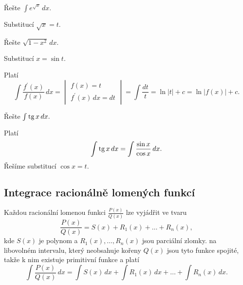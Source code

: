 \begin{priklad}
Řešte $\int e^{\sqrt{x} }\, dx$.
\end{priklad}

\begin{reseni}
Substitucí $\sqrt{x}=t $.
\end{reseni}

\begin{priklad}
Řešte $\sqrt{1-x^2}\, dx.$
\end{priklad}

\begin{reseni}
Substitucí $x=\sin t$.
\end{reseni}

\begin{pozn}
    Platí
    $$\int \frac{f^\prime(x)}{f(x)}\, dx=\begin{vmatrix}
        f(x)=t \\
        f^\prime(x) \, dx = dt
    \end{vmatrix}=\int \frac{dt}{t}=\ln |t|+c=\ln |f(x)|+c.$$
\end{pozn}

\begin{priklad}
Řešte $\int \operatorname{tg} x\, dx.$
\end{priklad}

\begin{reseni}
Platí
$$\int \operatorname{tg} x\, dx=\int \frac{\sin x}{\cos x}\, dx.$$
Řešíme substitucí $\cos x=t.$
\end{reseni}

\subsection*{Integrace racionálně lomených funkcí}
\begin{pozn}
    Každou racionální lomenou funkci $\frac{P(x)}{Q(x)}$ lze vyjádřit ve tvaru
    $$\frac{P(x)}{Q(x)}=S(x)+R_1(x)+\dots+R_n(x),$$
    kde $S(x)$ je polynom a $R_1(x),\dots,R_n(x)$ jsou parciální zlomky.
    na libovolném intervalu, který neobsahuje kořeny $Q(x)$ jsou tyto funkce spojité,
    takže k nim existuje primitivní funkce a platí
    $$\int \frac{P(x)}{Q(x)} \, dx=\int S(x)\, dx + \int R_1(x)\, dx + \dots + \int R_n(x)\, dx.$$
\end{pozn}

